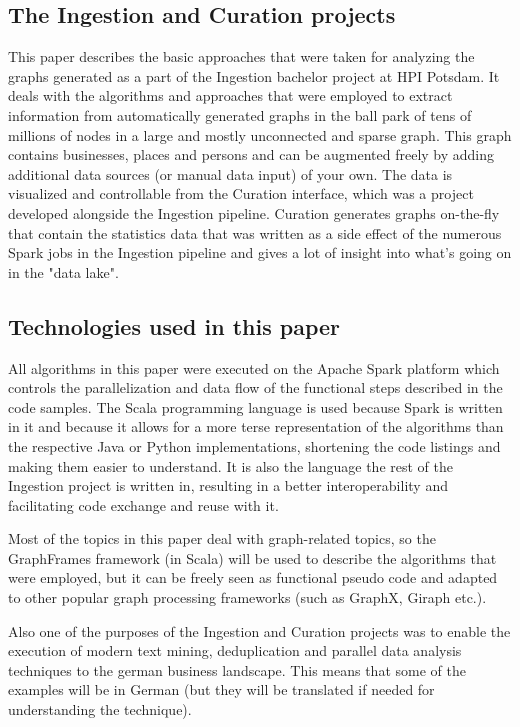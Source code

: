 \documentclass[
  a4paper,     %
  titlepage,   %
  oneside,     %
  parskip      %
]{scrartcl}          %
\begin{document}
    \subsection{The Ingestion and Curation projects}
    This paper describes the basic approaches that were taken for analyzing the
    graphs generated as a part of the Ingestion bachelor project at HPI Potsdam.
    It deals with the algorithms and approaches that were employed to extract
    information from automatically generated graphs in the ball park of
    tens of millions of nodes in a large and mostly unconnected and sparse graph.
    This graph contains businesses, places and persons and can be augmented freely by adding
    additional data sources (or manual data input) of your own. The data is visualized and controllable from the
    Curation interface, which was a project developed alongside the Ingestion pipeline.
    Curation generates graphs on-the-fly that contain the statistics data that was written
    as a side effect of the numerous Spark jobs in the Ingestion pipeline and gives
    a lot of insight into what's going on in the "data lake".

    \subsection{Technologies used in this paper}
    All algorithms in this paper were executed on the Apache Spark platform which
    controls the parallelization and data flow of the functional steps described
    in the code samples. The Scala programming language is used because Spark is
    written in it and because it allows for a more terse representation of the
    algorithms than the respective Java or Python implementations, shortening
    the code listings and making them easier to understand. It is also the language
    the rest of the Ingestion project is written in, resulting in a better interoperability
    and facilitating code exchange and reuse with it.

    Most of the topics in this paper deal with graph-related topics, so the GraphFrames framework
    (in Scala) will be used to describe the algorithms that were employed,
    but it can be freely seen as functional pseudo code and adapted to other popular
    graph processing frameworks (such as GraphX, Giraph etc.).

    Also one of the purposes of the Ingestion and Curation projects was to enable
    the execution of modern text mining, deduplication and parallel data analysis techniques
    to the german business landscape. This means that some of the examples will be
    in German (but they will be translated if needed for understanding the technique).
\end{document}

